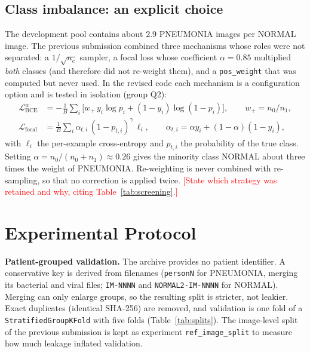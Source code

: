 \documentclass[12pt,letterpaper]{article}
\newcommand{\fillin}[1]{\textcolor{red}{[#1]}}
\begin{document}
\subsection{Class imbalance: an explicit choice}
\label{sec:imbalance}
The development pool contains about 2.9 PNEUMONIA images per NORMAL image. The previous
submission combined three mechanisms whose roles were not separated: a $1/\sqrt{n_c}$
sampler, a focal loss whose coefficient $\alpha=0.85$ multiplied \emph{both} classes
(and therefore did not re-weight them), and a \texttt{pos\_weight} that was computed but
never used. In the revised code each mechanism is a configuration option and is tested in
isolation (group Q2):
\begin{align*}
\mathcal{L}_{\mathrm{BCE}}^{w} &= -\tfrac{1}{B}\textstyle\sum_i \big[w_{+}\,y_i\log p_i + (1-y_i)\log(1-p_i)\big],
  \qquad w_{+}=n_0/n_1,\\
\mathcal{L}_{\mathrm{focal}} &= \tfrac{1}{B}\textstyle\sum_i \alpha_{t,i}\,(1-p_{t,i})^{\gamma}\,\ell_i,
  \qquad \alpha_{t,i}=\alpha y_i+(1-\alpha)(1-y_i),
\end{align*}
with $\ell_i$ the per-example cross-entropy and $p_{t,i}$ the probability of the true class.
Setting $\alpha=n_0/(n_0+n_1)\approx0.26$ gives the minority class NORMAL about three times
the weight of PNEUMONIA. Re-weighting is never combined with re-sampling, so that no
correction is applied twice. \fillin{State which strategy was retained and why, citing
Table~\ref{tab:screening}.}

\section{Experimental Protocol}
\label{sec:protocol}
\textbf{Patient-grouped validation.} The archive provides no patient identifier. A
conservative key is derived from filenames (\texttt{personN} for PNEUMONIA, merging its
bacterial and viral files; \texttt{IM-NNNN} and \texttt{NORMAL2-IM-NNNN} for NORMAL).
Merging can only enlarge groups, so the resulting split is stricter, not leakier. Exact
duplicates (identical SHA-256) are removed, and validation is one fold of a
\texttt{StratifiedGroupKFold} with five folds (Table~\ref{tab:splits}). The image-level split
of the previous submission is kept as experiment \texttt{ref\_image\_split} to measure how
much leakage inflated validation.

\begin{table}[htbp]
\centering
\caption{Split composition after duplicate removal. No patient key is shared between training and validation.}
\label{tab:splits}
\small

\end{table}
\end{document}

